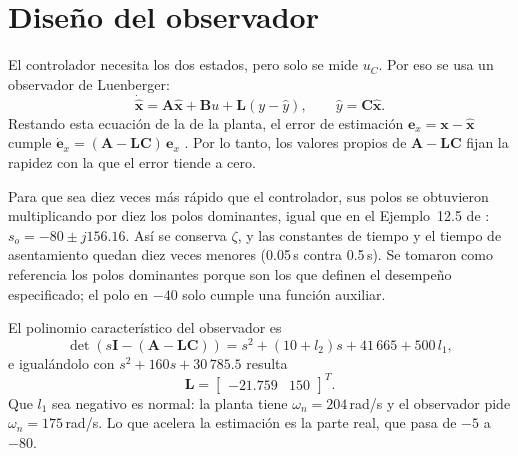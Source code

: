 \documentclass[conference,a4paper]{IEEEtran}
\begin{document}
\section{Diseño del observador}

El controlador necesita los dos estados, pero solo se mide $u_C$. Por eso se usa un observador de Luenberger:
\begin{equation}
\dot{\hat{\mathbf{x}}} = \mathbf{A}\hat{\mathbf{x}} + \mathbf{B}u + \mathbf{L}(y - \hat{y}), \qquad \hat{y} = \mathbf{C}\hat{\mathbf{x}}.
\end{equation}
Restando esta ecuación de la de la planta, el error de estimación $\mathbf{e}_x = \mathbf{x} - \hat{\mathbf{x}}$ cumple $\dot{\mathbf{e}}_x = (\mathbf{A} - \mathbf{L}\mathbf{C})\,\mathbf{e}_x$ \cite{nise}. Por lo tanto, los valores propios de $\mathbf{A} - \mathbf{L}\mathbf{C}$ fijan la rapidez con la que el error tiende a cero.

Para que sea diez veces más rápido que el controlador, sus polos se obtuvieron multiplicando por diez los polos dominantes, igual que en el Ejemplo~12.5 de \cite{nise}: $s_o = -80 \pm j156.16$. Así se conserva $\zeta$, y las constantes de tiempo y el tiempo de asentamiento quedan diez veces menores (0.05\,s contra 0.5\,s). Se tomaron como referencia los polos dominantes porque son los que definen el desempeño especificado; el polo en $-40$ solo cumple una función auxiliar.

El polinomio característico del observador es
\begin{equation}
\det\left(s\mathbf{I} - (\mathbf{A} - \mathbf{L}\mathbf{C})\right) = s^2 + (10 + l_2)s + 41\,665 + 500\,l_1,
\end{equation}
e igualándolo con $s^2 + 160s + 30\,785.5$ resulta
\begin{equation}
\mathbf{L} = \begin{bmatrix}-21.759 & 150\end{bmatrix}^T.
\end{equation}
Que $l_1$ sea negativo es normal: la planta tiene $\omega_n = 204$\,rad/s y el observador pide $\omega_n = 175$\,rad/s. Lo que acelera la estimación es la parte real, que pasa de $-5$ a $-80$.
\end{document}
